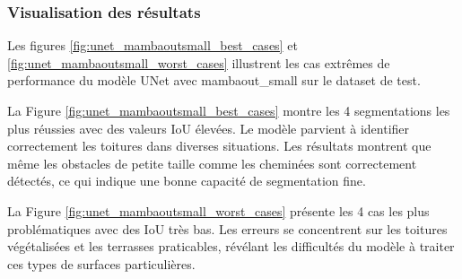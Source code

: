 \begin{table}[H]
    \centering
    \caption{Comparaison des performances des modèles avec et sans ensemble k-fold. Amélioration calculée par rapport à l'IoU moyen des folds.}
    \label{tab:kfold_ensemble}
\end{table}

\subsubsection{Visualisation des résultats}

Les figures \ref{fig:unet_mambaoutsmall_best_cases} et \ref{fig:unet_mambaoutsmall_worst_cases} illustrent les cas extrêmes de performance du modèle UNet avec mambaout\_small sur le dataset de test.

La Figure \ref{fig:unet_mambaoutsmall_best_cases} montre les 4 segmentations les plus réussies avec des valeurs IoU élevées. Le modèle parvient à identifier correctement les toitures dans diverses situations. Les résultats montrent que même les obstacles de petite taille comme les cheminées sont correctement détectés, ce qui indique une bonne capacité de segmentation fine.

La Figure \ref{fig:unet_mambaoutsmall_worst_cases} présente les 4 cas les plus problématiques avec des IoU très bas. Les erreurs se concentrent sur les toitures végétalisées et les terrasses praticables, révélant les difficultés du modèle à traiter ces types de surfaces particulières.

